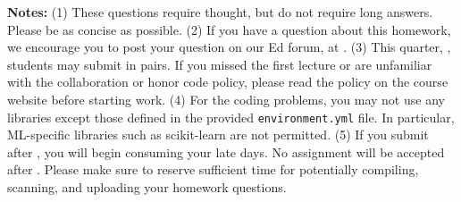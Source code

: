 {\bf Notes:} 
(1) These questions require thought, but do not require long
answers. Please be as concise as possible.  
(2) If you have a question
about this homework, we encourage you to post your question on our
Ed forum, at \piazza. 
(3) This quarter, \qtr, students may submit in pairs. If you
missed the first lecture or are unfamiliar with the collaboration or honor
code policy, please read the policy on the course website before starting work.
(4) For the coding problems, you may not
use any libraries except those defined in the provided \texttt{environment.yml}
file. In particular, ML-specific libraries such as scikit-learn are not
permitted. 
(5) If you submit after
\due, you will begin consuming your
late days. No assignment will be accepted after \latedue. Please make sure to reserve sufficient time for potentially compiling, scanning, and uploading your homework questions.